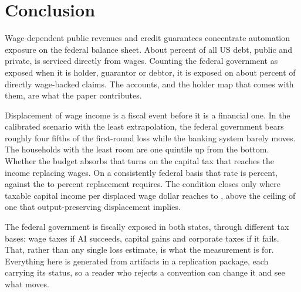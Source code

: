 \section{Conclusion}
\label{sec:conclusion}

Wage-dependent public revenues and credit guarantees concentrate automation exposure on the
federal balance sheet. About  percent of all US debt, public and private,
is serviced directly from wages. Counting the federal government as exposed when it is holder,
guarantor or debtor, it is exposed on about  percent of directly
wage-backed claims. The
accounts, and the holder map that comes with them, are what the paper contributes.

Displacement of wage income is a fiscal event before it is a financial one. In the calibrated
scenario with the least extrapolation, the federal government bears roughly four fifths of the
first-round loss while the banking system barely moves. The households with the least room are one
quintile up from the bottom. Whether the budget absorbs that turns on the capital tax that reaches
the income replacing wages. On a consistently federal basis that rate is
 percent, against the  to
 percent replacement requires. The condition closes only where taxable
capital income per displaced wage dollar reaches  to
, above the ceiling of one that output-preserving displacement implies.

The federal government is fiscally exposed in both states, through different tax bases: wage taxes
if AI succeeds, capital gains and corporate taxes if it fails. That, rather than any single loss
estimate, is what the measurement is for. Everything here is generated from artifacts in a
replication package, each carrying its status, so a reader who rejects a convention can change it
and see what moves.
